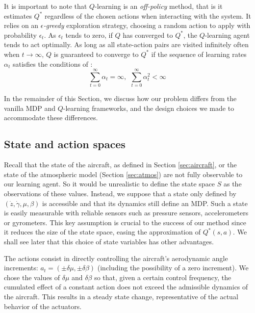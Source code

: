 \documentclass{jfpda}
\begin{document}
It is important to note that $Q$-learning is an \emph{off-policy} method, that is it estimates $Q^*$ regardless of the chosen actions when interacting with the system. It relies on an \emph{$\epsilon$-greedy} exploration strategy, choosing a random action to apply with probability $\epsilon_t$. As $\epsilon_t$ tends to zero, if $Q$ has converged to $Q^*$, the $Q$-learning agent tends to act optimally. As long as all state-action pairs are visited infinitely often when $t\rightarrow\infty$, $Q$ is guaranteed to converge to $Q^*$ if the sequence of learning rates $\alpha_t$ satisfies the conditions of \cite{robbins1951}: 
\begin{equation*}
\sum_{t=0}^\infty \alpha_t = \infty, \ \
\sum_{t=0}^\infty \alpha_t^2 < \infty
\end{equation*}

In the remainder of this Section, we discuss how our problem differs from the vanilla MDP and $Q$-learning frameworks, and the design choices we made to accommodate these differences.

\subsection{State and action spaces}

Recall that the state of the aircraft, as defined in Section \ref{sec:aircraft}, or the state of the atmospheric model (Section \ref{sec:atmos}) are not fully observable to our learning agent. So it would be unrealistic to define the state space $S$ as the observations of these values. Instead, we suppose that a state only defined by $(\dot{z}, \dot{\gamma}, \mu, \beta)$ is accessible and that its dynamics still define an MDP. Such a state is easily measurable with reliable sensors such as pressure sensors, accelerometers or gyrometers. This key assumption is crucial to the success of our method since it reduces the size of the state space, easing the approximation of $Q^*(s,a)$. We shall see later that this choice of state variables has other advantages.

The actions consist in directly controlling the aircraft's aerodynamic angle increments: $a_t=(\pm\delta\mu,\pm\delta\beta)$ (including the possibility of a zero increment).
We chose the values of $\delta\mu$ and $\delta\beta$ so that, given a certain control frequency, the cumulated effect of a constant action does not exceed the admissible dynamics of the aircraft. This results in a steady state change, representative of the actual behavior of the actuators.
\end{document}

